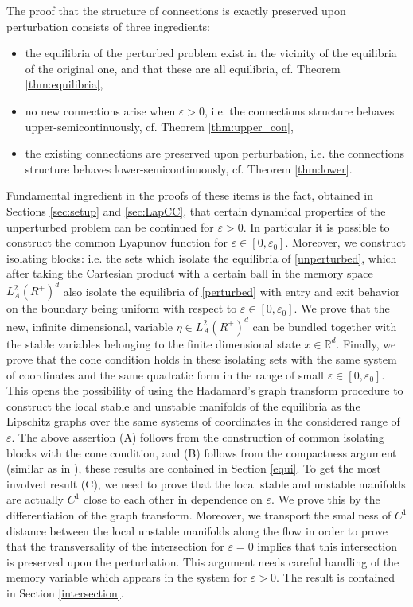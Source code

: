 \documentclass[11pt, leqno]{amsart}
\theoremstyle{definition}
\def\R{\mathbb{R}}
\begin{document}
	The proof that the structure of connections is exactly preserved upon perturbation consists of three ingredients:
	\begin{itemize}
		\item[(A)] the equilibria of the perturbed problem exist in the vicinity of the equilibria of the original one, and that these are all equilibria, cf. Theorem \ref{thm:equilibria},
		\item[(B)] no new connections arise when $\varepsilon>0$, i.e. the connections structure behaves upper-semi\-con\-ti\-nuously, cf. Theorem \ref{thm:upper_con},
		\item[(C)] the existing connections are preserved upon perturbation, i.e. the connections structure behaves lower-semicontinuously, cf. Theorem \ref{thm:lower}.
	\end{itemize}
	Fundamental ingredient in the proofs of these items is the fact, obtained in Sections \ref{sec:setup} and \ref{sec:LapCC}, that certain dynamical properties of the unperturbed problem can be continued for $\varepsilon>0$. In particular it is possible to construct the common Lyapunov function for $\varepsilon \in [0,\varepsilon_0]$. Moreover,  we  construct isolating blocks: i.e. the sets which isolate the equilibria of \eqref{unperturbed}, which after taking the Cartesian product with a certain ball in the memory space $L^2_A(R^+)^d$  also isolate the equilibria of \eqref{perturbed} with entry and exit behavior on the boundary being uniform with respect to $\varepsilon\in [0,\varepsilon_0]$. We prove that the new, infinite dimensional, variable $\eta \in L^2_A(R^+)^d$ can be bundled together with the stable variables belonging to the finite dimensional state $x\in \R^d$. Finally, we prove that the cone condition holds in these isolating sets with the same system of coordinates and the same quadratic form in the range of small $\varepsilon\in [0,\varepsilon_0]$.
	This opens the possibility of using the Hadamard's graph transform procedure to  construct the local stable and unstable manifolds of the equilibria as the Lipschitz graphs over the same systems of coordinates in the considered range of $\varepsilon$. The above assertion (A) follows from the construction of common isolating blocks with the cone condition, and (B) follows from the compactness argument (similar as in \cite{borto}), these results are contained in Section \ref{equi}.
	To get the most involved result (C), we need to prove that the local stable and unstable manifolds are actually $C^1$ close to each other in dependence on $\varepsilon$. We prove this by the differentiation of the graph transform. Moreover, we transport the smallness of $C^1$ distance between the local unstable manifolds along the flow in order to prove that the transversality of the intersection for $\varepsilon=0$ implies that this intersection is preserved upon the perturbation. This argument needs careful handling of the memory variable which appears in the system for $\varepsilon>0$. The result is contained in Section \ref{intersection}.
\end{document}
